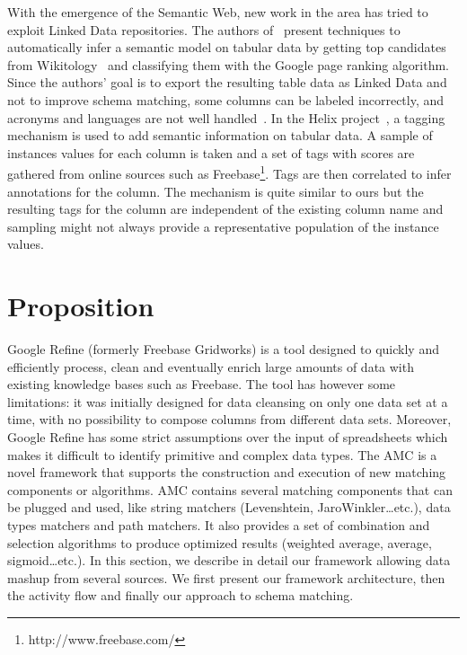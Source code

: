 With the emergence of the Semantic Web, new work in the area has tried to exploit Linked Data repositories. The authors of~\cite{Syed:WebSci:10} present techniques to automatically infer a semantic model on tabular data by getting top candidates from Wikitology~\cite{Finin:AAAI:09} and classifying them with the Google page ranking algorithm. Since the authors' goal is to export the resulting table data as Linked Data and not to improve schema matching, some columns can be labeled incorrectly, and acronyms and languages are not well handled~\cite{Syed:WebSci:10}. In the Helix project~\cite{Hassanzadeh:WWW:11}, a tagging mechanism is used to add semantic information on tabular data. A sample of instances values for each column is taken and a set of tags with scores are gathered from online sources such as Freebase\footnote{http://www.freebase.com/}. Tags are then correlated to infer annotations for the column. The mechanism is quite similar to ours but the resulting tags for the column are independent of the existing column name and sampling might not always provide a representative population of the instance values.


\section{Proposition}

Google Refine (formerly Freebase Gridworks) is a tool designed to quickly and efficiently process, clean and eventually enrich large amounts of data with existing knowledge bases such as Freebase. The tool has however some limitations: it was initially designed for data cleansing on only one data set at a time, with no possibility to compose columns from different data sets. Moreover, Google Refine has some strict assumptions over the input of spreadsheets which makes it difficult to identify primitive and complex data types.
The AMC is a novel framework that supports the construction and execution of new matching components or algorithms. AMC contains several matching components that can be plugged and used, like string matchers (Levenshtein, JaroWinkler\dots  etc.), data types matchers and path matchers. It also provides a set of combination and selection algorithms to produce optimized results (weighted average, average, sigmoid\dots  etc.).
In this section, we describe in detail our framework allowing data mashup from several sources. We first present our framework architecture, then the activity flow and finally our approach to schema matching.

